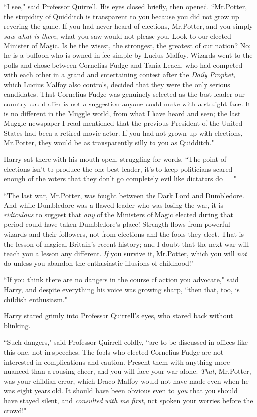``I see," said Professor Quirrell. His eyes closed briefly, then opened. ``Mr.\?Potter, the stupidity of Quidditch is transparent to you because you did not grow up revering the game. If you had never heard of elections, Mr.\?Potter, and you simply \emph{saw what is there}, what you saw would not please you. Look to our elected Minister of Magic. Is he the wisest, the strongest, the greatest of our nation? No; he is a buffoon who is owned in fee simple by Lucius Malfoy. Wizards went to the polls and chose between Cornelius Fudge and Tania Leach, who had competed with each other in a grand and entertaining contest after the \emph{Daily Prophet,} which Lucius Malfoy also controls, decided that they were the only serious candidates. That Cornelius Fudge was genuinely selected as the best leader our country could offer is not a suggestion anyone could make with a straight face. It is no different in the Muggle world, from what I have heard and seen; the last Muggle newspaper I read mentioned that the previous President of the United States had been a retired movie actor. If you had not grown up with elections, Mr.\?Potter, they would be as transparently silly to you as Quidditch."

Harry sat there with his mouth open, struggling for words. ``The point of elections isn't to produce the one best leader, it's to keep politicians scared enough of the voters that they don't go completely evil like dictators do\==="

``The last war, Mr.\?Potter, was fought between the Dark Lord and Dumbledore. And while Dumbledore was a flawed leader who was losing the war, it is \emph{ridiculous} to suggest that \emph{any} of the Ministers of Magic elected during that period could have taken Dumbledore's place! Strength flows from powerful wizards and their followers, not from elections and the fools they elect. That is the lesson of magical Britain's recent history; and I doubt that the next war will teach you a lesson any different. \emph{If} you survive it, Mr.\?Potter, which you will \emph{not} do unless you abandon the enthusiastic illusions of childhood!"

``If you think there are no dangers in the course of action you advocate," said Harry, and despite everything his voice was growing sharp, ``then that, too, is childish enthusiasm."

Harry stared grimly into Professor Quirrell's eyes, who stared back without blinking.

``Such dangers," said Professor Quirrell coldly, ``are to be discussed in offices like this one, not in speeches. The fools who elected Cornelius Fudge are not interested in complications and caution. Present them with anything more nuanced than a rousing cheer, and you will face your war alone. \emph{That}, Mr.\?Potter, was your childish error, which Draco Malfoy would not have made even when he was eight years old. It should have been obvious even to \emph{you} that you should have stayed silent, and \emph{consulted with me first}, not spoken your worries before the crowd!"

